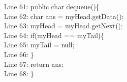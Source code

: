 \documentclass{article}
\begin{document}
\vspace{2em}
Line 61: public char dequeue()\{\\
    \hspace*{1.5em}Line 62:  \hspace*{1em}char ans = myHead.getData();\\
	\hspace*{1.5em}Line 63: \hspace*{1em}myHead = myHead.getNext();\\
    \hspace*{1.5em}Line 64: \hspace*{1em}if(myHead == myTail)\{\\
    \hspace*{1.5em}Line 65: \hspace*{2em}myTail = null;\\
    \hspace*{1.5em}Line 66:\hspace*{1em} \}\\
	\hspace*{1.5em}Line 67:\hspace*{1em} return ans;\\
    \hspace*{1.5em}Line 68: \}\\
\vspace{2em}
\end{document}
